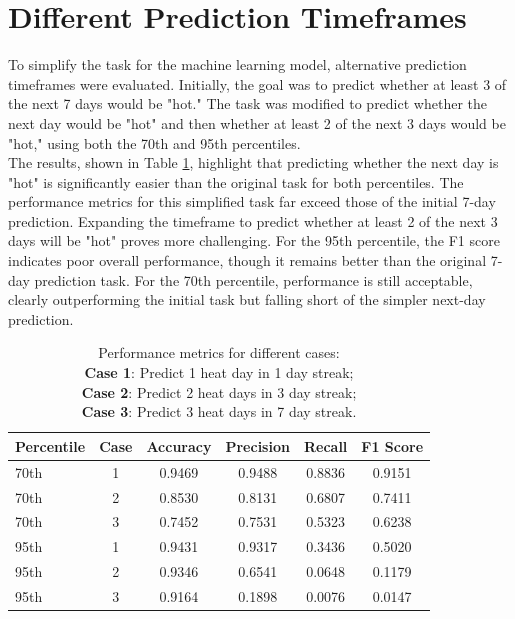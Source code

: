 \documentclass[conference,9pt]{IEEEtran}
\begin{document}
\section{Different Prediction Timeframes}
To simplify the task for the machine learning model, alternative prediction timeframes were evaluated. Initially, the goal was to predict whether at least 3 of the next 7 days would be "hot." The task was modified to predict whether the next day would be "hot" and then whether at least 2 of the next 3 days would be "hot," using both the 70th and 95th percentiles. \\
The results, shown in Table \ref{tab:timeframe}, highlight that predicting whether the next day is "hot" is significantly easier than the original task for both percentiles. The performance metrics for this simplified task far exceed those of the initial 7-day prediction. Expanding the timeframe to predict whether at least 2 of the next 3 days will be "hot" proves more challenging. For the 95th percentile, the F1 score indicates poor overall performance, though it remains better than the original 7-day prediction task. For the 70th percentile, performance is still acceptable, clearly outperforming the initial task but falling short of the simpler next-day prediction.
\begin{table}[h]
    \centering
    \caption{Performance metrics for different cases:\\
    \textbf{Case 1}: Predict 1 heat day in 1 day streak;\\
    \textbf{Case 2}: Predict 2 heat days in 3 day streak;\\
    \textbf{Case 3}: Predict 3 heat days in 7 day streak.}
    \label{tab:timeframe}
    \begin{tabular}{lccccc}
        \toprule
        \textbf{Percentile} & \textbf{Case} & \textbf{Accuracy} & \textbf{Precision} & \textbf{Recall} & \textbf{F1 Score} \\
        \midrule
        70th & 1 & 0.9469 & 0.9488 & 0.8836 & 0.9151 \\
        70th & 2 & 0.8530 & 0.8131 & 0.6807 & 0.7411 \\
        70th & 3 & 0.7452 & 0.7531 & 0.5323 & 0.6238 \\
        95th & 1 & 0.9431 & 0.9317 & 0.3436 & 0.5020 \\
        95th & 2 & 0.9346 & 0.6541 & 0.0648 & 0.1179 \\
        95th & 3 & 0.9164 & 0.1898 & 0.0076 & 0.0147 \\
        \bottomrule
    \end{tabular}
\end{table}
\end{document}
